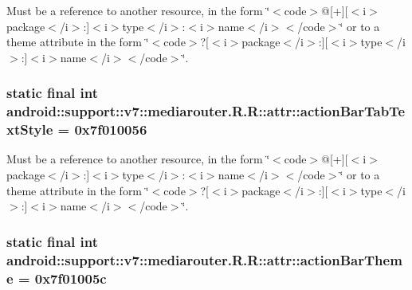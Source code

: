 Must be a reference to another resource, in the form \char`\"{}$<$code$>$@\mbox{[}+\mbox{]}\mbox{[}$<$i$>$package$<$/i$>$:\mbox{]}$<$i$>$type$<$/i$>$:$<$i$>$name$<$/i$>$$<$/code$>$\char`\"{} or to a theme attribute in the form \char`\"{}$<$code$>$?\mbox{[}$<$i$>$package$<$/i$>$:\mbox{]}\mbox{[}$<$i$>$type$<$/i$>$:\mbox{]}$<$i$>$name$<$/i$>$$<$/code$>$\char`\"{}. \hypertarget{classandroid_1_1support_1_1v7_1_1mediarouter_1_1_r_1_1attr_b97a71c7d7710ecc10d34d0581f49590}{
\subsubsection[{actionBarTabTextStyle}]{\setlength{\rightskip}{0pt plus 5cm}static final int android::support::v7::mediarouter.R.R::attr::actionBarTabTextStyle = 0x7f010056}}
\label{classandroid_1_1support_1_1v7_1_1mediarouter_1_1_r_1_1attr_b97a71c7d7710ecc10d34d0581f49590}


Must be a reference to another resource, in the form \char`\"{}$<$code$>$@\mbox{[}+\mbox{]}\mbox{[}$<$i$>$package$<$/i$>$:\mbox{]}$<$i$>$type$<$/i$>$:$<$i$>$name$<$/i$>$$<$/code$>$\char`\"{} or to a theme attribute in the form \char`\"{}$<$code$>$?\mbox{[}$<$i$>$package$<$/i$>$:\mbox{]}\mbox{[}$<$i$>$type$<$/i$>$:\mbox{]}$<$i$>$name$<$/i$>$$<$/code$>$\char`\"{}. \hypertarget{classandroid_1_1support_1_1v7_1_1mediarouter_1_1_r_1_1attr_22882c85ee37b45f4ad87d893cde5683}{
\subsubsection[{actionBarTheme}]{\setlength{\rightskip}{0pt plus 5cm}static final int android::support::v7::mediarouter.R.R::attr::actionBarTheme = 0x7f01005c}}
\label{classandroid_1_1support_1_1v7_1_1mediarouter_1_1_r_1_1attr_22882c85ee37b45f4ad87d893cde5683}


